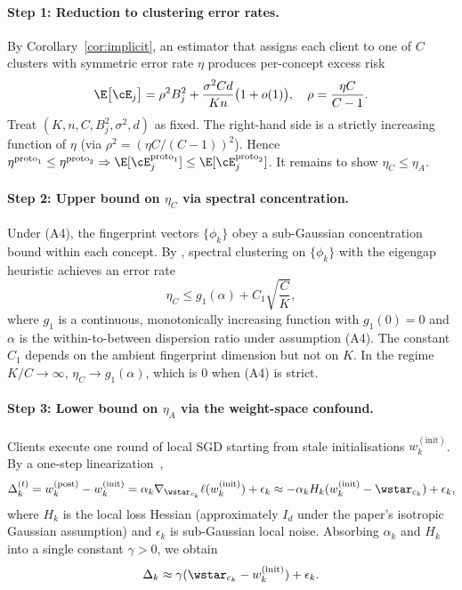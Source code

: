 \paragraph{Step 1: Reduction to clustering error rates.}
By Corollary~\ref{cor:implicit}, an estimator that assigns each client to one of $C$ clusters with symmetric error rate $\eta$ produces per-concept excess risk
\[
\E\bigl[\cE_j\bigr] = \rho^2 B_j^2 + \frac{\sigma^2 C d}{K n}\bigl(1 + o(1)\bigr), \quad \rho = \frac{\eta C}{C - 1}.
\]
Treat $(K, n, C, B_j^2, \sigma^2, d)$ as fixed. The right-hand side is a strictly increasing function of $\eta$ (via $\rho^2 = (\eta C/(C{-}1))^2$). Hence $\eta^{\mathrm{proto}_1} \le \eta^{\mathrm{proto}_2} \Rightarrow \E[\cE_j^{\mathrm{proto}_1}] \le \E[\cE_j^{\mathrm{proto}_2}]$. It remains to show $\eta_C \le \eta_A$.

\paragraph{Step 2: Upper bound on $\eta_C$ via spectral concentration.}
Under (A4), the fingerprint vectors $\{\phi_k\}$ obey a sub-Gaussian concentration bound within each concept. By \citet[Theorem 3.1]{lei2015consistency}, spectral clustering on $\{\phi_k\}$ with the eigengap heuristic achieves an error rate
\[
\eta_C \le g_1(\alpha) + C_1 \sqrt{\frac{C}{K}},
\]
where $g_1$ is a continuous, monotonically increasing function with $g_1(0) = 0$ and $\alpha$ is the within-to-between dispersion ratio under assumption (A4). The constant $C_1$ depends on the ambient fingerprint dimension but not on $K$. In the regime $K/C \to \infty$, $\eta_C \to g_1(\alpha)$, which is $0$ when (A4) is strict.

\paragraph{Step 3: Lower bound on $\eta_A$ via the weight-space confound.}
Clients execute one round of local SGD starting from stale initialisations $w_k^{(\mathrm{init})}$. By a one-step linearization~\citep{mania2016perturbed},
\[
\Delta_k^{(t)} = w_k^{(\mathrm{post})} - w_k^{(\mathrm{init})} = \alpha_k \nabla_{\wstar_{c_k}} \ell(w_k^{(\mathrm{init})}) + \epsilon_k
\approx -\alpha_k H_k (w_k^{(\mathrm{init})} - \wstar_{c_k}) + \epsilon_k,
\]
where $H_k$ is the local loss Hessian (approximately $I_d$ under the paper's isotropic Gaussian assumption) and $\epsilon_k$ is sub-Gaussian local noise. Absorbing $\alpha_k$ and $H_k$ into a single constant $\gamma > 0$, we obtain
\[
\Delta_k \approx \gamma (\wstar_{c_k} - w_k^{(\mathrm{init})}) + \epsilon_k.
\]

